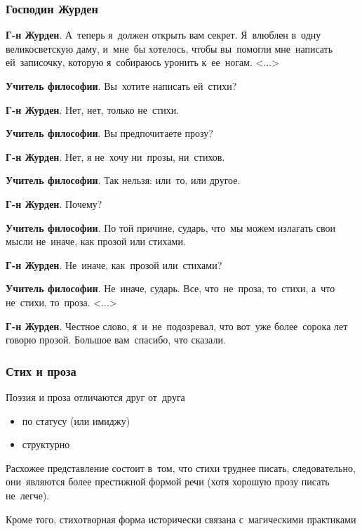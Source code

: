 \documentclass{beamer}
\begin{document}
\begin{frame}
\frametitle{Господин Журден}

\textbf{Г-н Журден}. А~теперь я~должен открыть вам секрет. Я~влюблен в~одну великосветскую даму, и~мне~бы хотелось, чтобы вы~помогли мне~написать ей~записочку, которую я~собираюсь уронить к~ее~ногам. <...>

\textbf{Учитель философии}. Вы~хотите написать ей~стихи?

\textbf{Г-н Журден}. Нет, нет, только не~стихи.

\textbf{Учитель философии}. Вы предпочитаете прозу?

\textbf{Г-н Журден}. Нет, я не~хочу ни~прозы, ни~стихов.

\textbf{Учитель философии}. Так нельзя: или~то, или другое.

\textbf{Г-н Журден}. Почему?

\textbf{Учитель философии}. По той причине, сударь, что~мы можем излагать свои мысли не~иначе, как прозой или стихами.

\textbf{Г-н Журден}. Не~иначе, как~прозой или~стихами?

\textbf{Учитель философии}. Не~иначе, сударь. Все, что~не~проза, то~стихи, а~что не~стихи, то~проза.
<...>

\textbf{Г-н Журден}. Честное слово, я~и~не~подозревал, что вот~уже более~сорока лет говорю прозой. Большое вам~спасибо, что сказали.

\end{frame}


\begin{frame}
\frametitle{Стих и проза}
Поэзия и проза отличаются друг от~друга

\begin{itemize}
\item по статусу (или имиджу)
\item структурно
\end{itemize}

Расхожее представление состоит в~том, что стихи труднее писать, следовательно, они~являются более престижной формой речи (хотя хорошую прозу писать не~легче).

Кроме того, стихотворная форма исторически связана с~магическими практиками

\end{frame}

\end{document}
